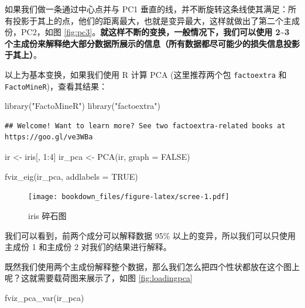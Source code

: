 \documentclass[
]{krantz}
\makeatletter
\newenvironment{Shaded}{\begin{snugshade}}{\end{snugshade}}
\newcommand{\AttributeTok}[1]{\textcolor[rgb]{0.77,0.63,0.00}{#1}}
\newcommand{\ConstantTok}[1]{\textcolor[rgb]{0.00,0.00,0.00}{#1}}
\newcommand{\DecValTok}[1]{\textcolor[rgb]{0.00,0.00,0.81}{#1}}
\newcommand{\FunctionTok}[1]{\textcolor[rgb]{0.00,0.00,0.00}{#1}}
\newcommand{\NormalTok}[1]{#1}
\newcommand{\OtherTok}[1]{\textcolor[rgb]{0.56,0.35,0.01}{#1}}
\newcommand{\SpecialCharTok}[1]{\textcolor[rgb]{0.00,0.00,0.00}{#1}}
\newcommand{\StringTok}[1]{\textcolor[rgb]{0.31,0.60,0.02}{#1}}
\newenvironment{kframe}{%
\medskip{}
\setlength{\fboxsep}{.8em}
 \def\at@end@of@kframe{}%
 \ifinner\ifhmode%
  \def\at@end@of@kframe{\end{minipage}}%
  \begin{minipage}{\columnwidth}%
 \fi\fi%
 \def\FrameCommand##1{\hskip\@totalleftmargin \hskip-\fboxsep
 \colorbox{shadecolor}{##1}\hskip-\fboxsep
     \hskip-\linewidth \hskip-\@totalleftmargin \hskip\columnwidth}%
 \MakeFramed {\advance\hsize-\width
   \@totalleftmargin\z@ \linewidth\hsize
   \@setminipage}}%
 {\par\unskip\endMakeFramed%
 \at@end@of@kframe}
\renewenvironment{Shaded}{\begin{kframe}}{\end{kframe}}
\makeatother
\begin{document}
如果我们做一条通过中心点并与 PC1 垂直的线，并不断旋转这条线使其满足：所有投影于其上的点，他们的距离最大，也就是变异最大，这样就做出了第二个主成份，PC2，如图 \ref{fig:pc3}。\textbf{就这样不断的变换，一般情况下，我们可以使用 2\textasciitilde3 个主成份来解释绝大部分数据所展示的信息（所有数据都尽可能少的损失信息投影于其上）}。

以上为基本变换，如果我们使用 R 计算 PCA (这里推荐两个包 \texttt{factoextra} 和 \texttt{FactoMineR})，查看其结果：

\begin{Shaded}
\begin{Highlighting}[]
\FunctionTok{library}\NormalTok{(}\StringTok{"FactoMineR"}\NormalTok{)}
\FunctionTok{library}\NormalTok{(}\StringTok{"factoextra"}\NormalTok{)}
\end{Highlighting}
\end{Shaded}

\begin{verbatim}
## Welcome! Want to learn more? See two factoextra-related books at https://goo.gl/ve3WBa
\end{verbatim}

\begin{Shaded}
\begin{Highlighting}[]
\NormalTok{ir }\OtherTok{\textless{}{-}}\NormalTok{ iris[, }\DecValTok{1}\SpecialCharTok{:}\DecValTok{4}\NormalTok{]}
\NormalTok{ir\_pca }\OtherTok{\textless{}{-}} \FunctionTok{PCA}\NormalTok{(ir, }\AttributeTok{graph =} \ConstantTok{FALSE}\NormalTok{)}

\FunctionTok{fviz\_eig}\NormalTok{(ir\_pca, }\AttributeTok{addlabels =} \ConstantTok{TRUE}\NormalTok{)}
\end{Highlighting}
\end{Shaded}

\begin{figure}
\centering
\texttt{[image: bookdown\_files/figure-latex/scree-1.pdf]}
\caption{\label{fig:scree}iris 碎石图}
\end{figure}

我们可以看到，前两个成分可以解释数据 95\% 以上的变异，所以我们可以只使用主成份 1 和主成份 2 对我们的结果进行解释。

既然我们使用两个主成份解释整个数据，那么我们怎么把四个性状都放在这个图上呢？这就需要载荷图来展示了，如图 \ref{fig:loadingpca}

\begin{Shaded}
\begin{Highlighting}[]
\FunctionTok{fviz\_pca\_var}\NormalTok{(ir\_pca)}
\end{Highlighting}
\end{Shaded}
\end{document}
